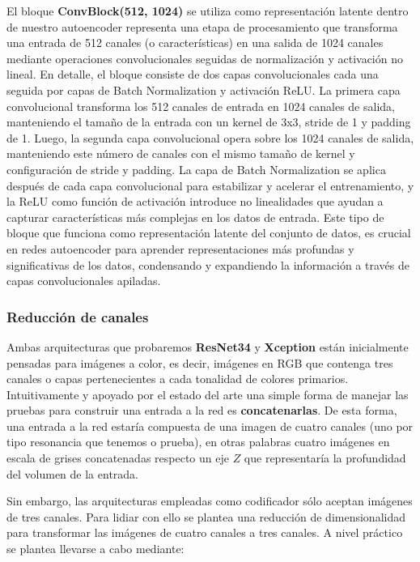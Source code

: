 El bloque \textbf{ConvBlock(512, 1024)} se utiliza como representación latente dentro de nuestro autoencoder representa una etapa de procesamiento que transforma una entrada de 512 canales (o características) en una salida de 1024 canales mediante operaciones convolucionales seguidas de normalización y activación no lineal. En detalle, el bloque consiste de dos capas convolucionales cada una seguida por capas de Batch Normalization y activación ReLU. La primera capa convolucional transforma los 512 canales de entrada en 1024 canales de salida, manteniendo el tamaño de la entrada con un kernel de 3x3, stride de 1 y padding de 1. Luego, la segunda capa convolucional opera sobre los 1024 canales de salida, manteniendo este número de canales con el mismo tamaño de kernel y configuración de stride y padding. La capa de Batch Normalization se aplica después de cada capa convolucional para estabilizar y acelerar el entrenamiento, y la ReLU como función de activación introduce no linealidades que ayudan a capturar características más complejas en los datos de entrada. Este tipo de bloque que funciona como representación latente del conjunto de datos, es crucial en redes autoencoder para aprender representaciones más profundas y significativas de los datos, condensando y expandiendo la información a través de capas convolucionales apiladas.

\subsubsection{Reducción de canales}

Ambas arquitecturas que probaremos \textbf{ResNet34} y \textbf{Xception} están inicialmente pensadas para imágenes a color, es decir, imágenes en RGB que contenga tres canales o capas pertenecientes a cada tonalidad de colores primarios. Intuitivamente y apoyado por el estado del arte una simple forma de manejar las pruebas para construir una entrada a la red es \textbf{concatenarlas}. De esta forma, una entrada a la red estaría compuesta de una imagen de cuatro canales (uno por tipo resonancia que tenemos o prueba), en otras palabras cuatro imágenes en escala de grises concatenadas respecto un eje $Z$ que representaría la profundidad del volumen de la entrada.


Sin embargo, las arquitecturas empleadas como codificador sólo aceptan imágenes de tres canales. Para lidiar con ello se plantea una reducción de dimensionalidad para transformar las imágenes de cuatro canales a tres canales. A nivel práctico se plantea llevarse a cabo mediante:

